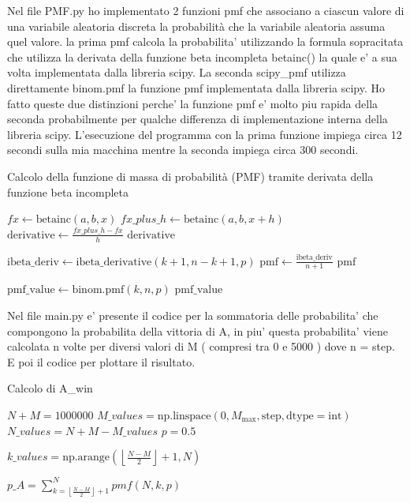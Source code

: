 \documentclass{article}
\begin{document}
Nel file PMF.py ho implementato 2 funzioni pmf che associano a ciascun valore di una variabile aleatoria discreta la probabilità che la variabile aleatoria assuma quel valore.
la prima pmf calcola la probabilita' utilizzando la formula sopracitata che utilizza la derivata della funzione beta incompleta betainc() la quale e' a sua volta implementata dalla libreria scipy. La seconda scipy\_pmf utilizza direttamente binom.pmf la funzione pmf implementata dalla libreria scipy.
\newline
Ho fatto queste due distinzioni perche' la funzione pmf e' molto piu rapida della seconda probabilmente per qualche differenza di implementazione interna della libreria scipy.
\newline 
L'esecuzione del programma con la prima funzione impiega circa 12 secondi sulla mia macchina mentre la seconda impiega circa 300 secondi.
\begin{algorithm}
\caption{Calcolo della funzione di massa di probabilità (PMF) tramite derivata della funzione beta incompleta}
\begin{algorithmic}[3]
    \State $fx \gets \text{betainc}(a, b, x)$
    \State $fx\_plus\_h \gets \text{betainc}(a, b, x + h)$
    \State $\text{derivative} \gets \frac{{fx\_plus\_h - fx}}{h}$
    \State \Return $\text{derivative}$
\EndFunction

    \State $\text{ibeta\_deriv} \gets \text{ibeta\_derivative}(k + 1, n - k + 1, p)$
    \State $\text{pmf} \gets \frac{{\text{ibeta\_deriv}}}{{n + 1}}$
    \State \Return $\text{pmf}$
\EndFunction

    \State $\text{pmf\_value} \gets \text{binom.pmf}(k, n, p)$
    \State \Return $\text{pmf\_value}$
\EndFunction
\end{algorithmic}
\end{algorithm}

Nel file main.py e' presente il codice per la sommatoria delle probabilita' che compongono la probabilita della vittoria di A, in piu' questa probabilita' viene calcolata n volte per diversi valori di M ( compresi tra 0 e 5000 ) dove n = step.
E poi il codice per plottare il risultato.

\begin{algorithm}
\caption{Calcolo di A\_win}
\begin{algorithmic}[1]
\State $N+M = 1000000$
\State $M\_values = \text{np.linspace}(0, M_{\text{max}}, \text{step}, \text{dtype}=\text{int})$
\State $N\_values = N+M - M\_values$
\State $p = 0.5$

        \State $k\_values = \text{np.arange}\left(\left\lfloor\frac{{N - M}}{2}\right\rfloor + 1, N\right)$

        \State $p\_A = \sum_{k = \left\lfloor \frac{N - M}{2} \right\rfloor + 1}^{N} pmf(N, k, p) $

    \EndFor

\EndFunction
\end{algorithmic}
\end{algorithm}
\end{document}
